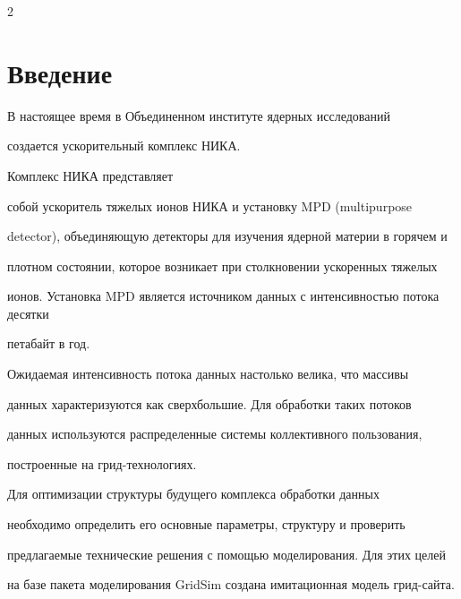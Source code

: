       \begin{multicols}{2}





            \label{st\stat}








\section{Введение}





   В настоящее время в Объединенном институте ядерных исследований 


создается ускорительный комплекс НИКА. 





Комплекс НИКА представляет 


собой ускоритель тяжелых ионов НИКА и установку MPD (multipurpose 


detector), объединяющую детекторы для изучения ядерной материи в горячем и 


плотном состоянии, которое возникает при столкновении ускоренных тяжелых 


ионов. Установка MPD является источником данных с интенсивностью потока десятки 


петабайт в год. 


   


   Ожидаемая интенсивность потока данных настолько велика, что массивы 


данных характеризуются как сверхбольшие. Для обработки таких потоков 


данных используются распределенные системы коллективного пользования, 


построенные на грид-тех\-но\-ло\-гиях.


   


   Для оптимизации структуры будущего комплекса обработки данных 


необходимо определить его основные параметры, структуру и проверить 


предлагаемые технические решения с помощью моделирования. Для этих целей 


на базе пакета моделирования GridSim создана имитационная модель грид-сайта.






\end{multicols}
